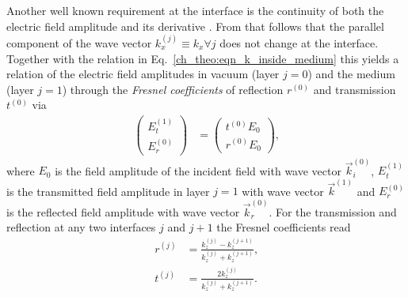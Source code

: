 Another well known requirement at the interface is the continuity of both the electric field amplitude and its derivative \cite{born_principles_1965, gibaud_specular_2009}. From that follows that the parallel component of the wave vector $k_x^{(j)} \equiv k_x \forall j$ does not change at the interface. Together with the relation in Eq.~\ref{ch_theo:eqn_k_inside_medium} this yields a relation of the electric field amplitudes in vacuum (layer $j=0$) and the medium (layer $j=1$) through the \emph{Fresnel coefficients} of reflection $r^{(0)}$ and transmission $t^{(0)}$ via
\begin{align}
\begin{pmatrix}
E_t^{(1)}  \\ 
E_r^{(0)}
\end{pmatrix} &=
\begin{pmatrix}
t^{(0)} E_0 \\
r^{(0)} E_0
\end{pmatrix} \text{,} \label{ch_theo:eqn_fresnel_reflection}
\end{align}
where $E_0$ is the field amplitude of the incident field with wave vector $\vec{k}_i^{(0)}$, $E_t^{(1)}$ is the transmitted field amplitude in layer $j=1$ with wave vector $\vec{k}^{(1)}$ and $E_r^{(0)}$ is the reflected field amplitude with wave vector $\vec{k}_r^{(0)}$. For the transmission and reflection at any two interfaces $j$ and $j+1$ the Fresnel coefficients read
\begin{align}
        r^{(j)} &= \frac{k_z^{(j)} - k_z^{(j+1)}}{k_z^{(j)} + 
k_z^{(j+1)}}\text{,}  \label{ch_theo:eqn_fresnel_reflection_coefficient}\\
        t^{(j)} &= \frac{2 k_z^{(j)}}{k_z^{(j)} + k_z^{(j+1)}}\text{.}  \label{ch_theo:eqn_fresnel_transmission_coefficient}
\end{align}



